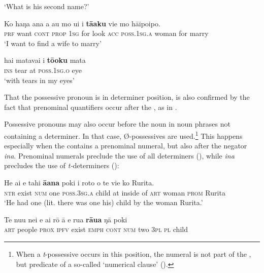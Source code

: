 \glt 
‘What is his second name?’ \textstyleExampleref{[R412.079]} 
\z

\ea\label{ex:6.5}
\gll Ko haŋa {\ꞌ}ana a au mo u{\ꞌ}i i \textbf{tā{\ꞌ}aku} vi{\ꞌ}e mo hāipoipo. \\
\textsc{prf} want \textsc{cont} \textsc{prop} \textsc{1sg} for look \textsc{acc} \textsc{poss.1sg.a} woman for marry \\

\glt 
‘I want to find a wife to marry’ \textstyleExampleref{[R491.005]} 
\z

\ea\label{ex:6.6}
\gll hai matavai {\ꞌ}i \textbf{tō{\ꞌ}oku} mata \\
\textsc{ins} tear at \textsc{poss.1sg.o} eye \\

\glt
‘with tears in my eyes’ \textstyleExampleref{[R221.009]} 
\z

That the possessive pronoun is in determiner position, is also confirmed by the fact that prenominal quantifiers occur after the , as in .

Possessive pronouns may also occur before the noun in noun phrases not containing a determiner. In that case, Ø\nobreakdash-possessives are used.\footnote{\label{fn:285}When a \textit{t}{}-possessive occurs in this position, the numeral is not part of the , but predicate of a so-called ‘numerical clause’ ().} This happens especially when the  contains a prenominal numeral, but also after the negator \textit{{\ꞌ}ina}. Prenominal numerals preclude the use of all determiners (), while \textit{{\ꞌ}ina} precludes the use of \textit{t-}determiners ():

\ea\label{ex:6.7}
\gll He ai e tahi \textbf{{\ꞌ}ā{\ꞌ}ana} poki {\ꞌ}i roto o te vi{\ꞌ}e ko Rurita. \\
\textsc{ntr} exist \textsc{num} one \textsc{poss.3sg.a} child at inside of \textsc{art} woman \textsc{prom} Rurita \\

\glt 
‘He had one (lit. there was one his) child by the woman Rurita.’ \textstyleExampleref{[R309.027]} 
\z

\ea\label{ex:6.8}
\gll Te nu{\ꞌ}u nei e ai rō {\ꞌ}ā e rua \textbf{rāua} ŋā poki \\
\textsc{art} people \textsc{prox} \textsc{ipfv} exist \textsc{emph} \textsc{cont} \textsc{num} two \textsc{3pl} \textsc{pl} child \\

